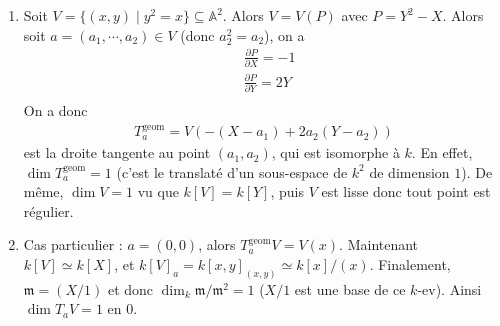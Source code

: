                 \begin{expl}
                    \begin{enumerate}
                        \item Soit $V = \{(x,y) \mid y^2 = x\} \subseteq \mathbb{A}^2$. Alors $V = V(P)$ avec $P = Y^2 - X$. Alors soit $a = (a_1, \cdots, a_2) \in V$ (donc $a_2^2 = a_2$), on a 
                        \begin{align*}
                            &\frac{\partial P}{\partial X} = -1 \\
                            &\frac{\partial P}{\partial Y} = 2Y \\
                        \end{align*}
                        On a donc 
                        \begin{align*}
                            T_a^\mathrm{geom} = V(-(X - a_1) + 2a_2(Y - a_2))
                        \end{align*}
                        est la droite tangente au point $(a_1, a_2)$, qui est isomorphe à $k$. En effet, $\dim T_a^\mathrm{geom} = 1$ (c'est le translaté d'un sous-espace de $k^2$ de dimension $1$). De même, $\dim V = 1$ vu que $k[V] = k[Y]$, puis $V$ est lisse donc tout point est régulier.
                        \item Cas particulier : $a = (0,0)$, alors $T_a^\mathrm{geom} V = V(x)$. Maintenant $k[V] \simeq k[X]$, et $k[V]_a = k[x,y]_{(x,y)} \simeq k[x]/(x)$. Finalement, $\mathfrak{m} = (X/1)$ et donc $\dim_k \mathfrak{m}/\mathfrak{m}^2 = 1$ ($X/1$ est une base de ce $k$-ev). Ainsi $\dim T_aV = 1$ en $0$.
                    \end{enumerate}
                \end{expl}
                